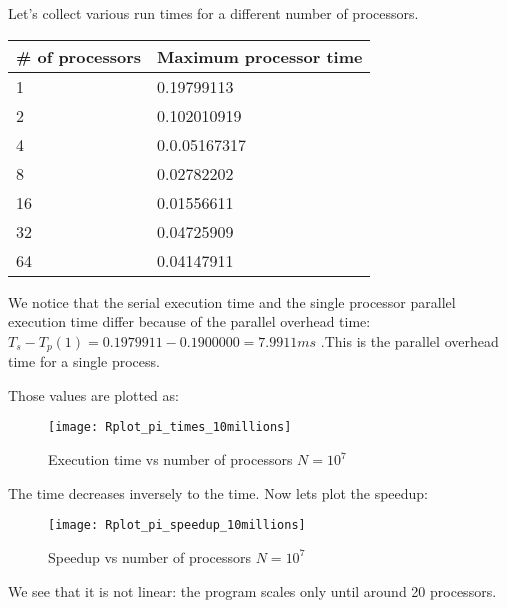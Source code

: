 \documentclass[11pt]{scrartcl} %
\begin{document}
Let's collect various run times for a different number of processors. 
\begin{adjustwidth}{2cm}{}
	\begin{tabular}[h]{l|l }
		\hline
			\# of processors&Maximum processor time\\
			\hline
			1&0.19799113\\
			2&0.102010919\\
			4&0.0.05167317\\
			8&0.02782202\\
			16&0.01556611\\
			32&0.04725909\\
			64&0.04147911\\
		\end{tabular}
	\end{adjustwidth}
We notice that the serial execution time and the single processor parallel execution time differ because of the parallel overhead time: $T_s-T_p(1)= 0.1979911-0.1900000= 7.9911 ms$ .This is the parallel overhead time for a single process.

Those values are plotted as:
\begin{figure}[H] %
	\centering
	\texttt{[image: Rplot\_pi\_times\_10millions]} %
	\caption{Execution time vs number of processors $N = 10^7$ }
\end{figure}

The time decreases inversely to the time. Now lets plot the speedup: 
\begin{figure}[H] %
	\centering
	\texttt{[image: Rplot\_pi\_speedup\_10millions]} %
	\caption{Speedup vs number of processors $N=10^7$}
\end{figure}
We see that it is not linear: the program scales only until around 20 processors.
\end{document}
